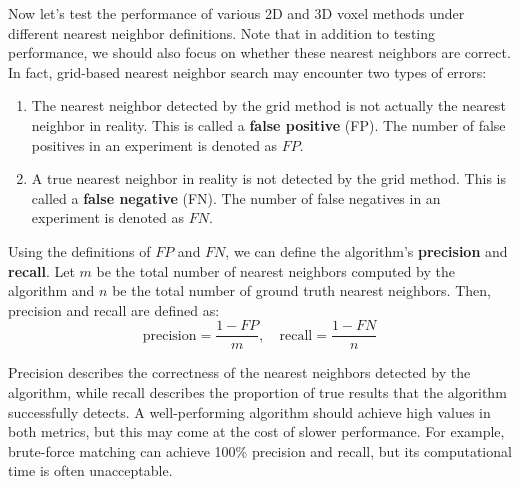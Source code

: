 Now let's test the performance of various 2D and 3D voxel methods under different nearest neighbor definitions. Note that in addition to testing performance, we should also focus on whether these nearest neighbors are correct. In fact, grid-based nearest neighbor search may encounter two types of errors:

\begin{enumerate}
	\item The nearest neighbor detected by the grid method is not actually the nearest neighbor in reality. This is called a \textbf{false positive} (FP). The number of false positives in an experiment is denoted as \(FP\).
	\item A true nearest neighbor in reality is not detected by the grid method. This is called a \textbf{false negative} (FN). The number of false negatives in an experiment is denoted as \(FN\).
\end{enumerate}

Using the definitions of \(FP\) and \(FN\), we can define the algorithm's \textbf{precision} and \textbf{recall}. Let \(m\) be the total number of nearest neighbors computed by the algorithm and \(n\) be the total number of ground truth nearest neighbors. Then, precision and recall are defined as:
\begin{equation}\label{key}
	\text{precision} = \frac{1-FP}{m}, \quad \text{recall} = \frac{1-FN}{n}
\end{equation}

Precision describes the correctness of the nearest neighbors detected by the algorithm, while recall describes the proportion of true results that the algorithm successfully detects. A well-performing algorithm should achieve high values in both metrics, but this may come at the cost of slower performance. For example, brute-force matching can achieve 100\% precision and recall, but its computational time is often unacceptable.

